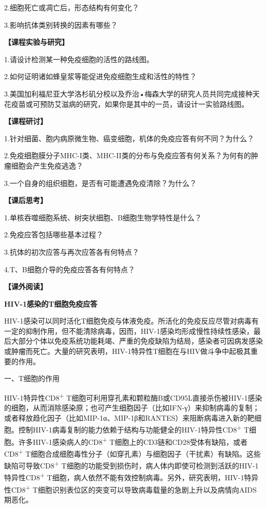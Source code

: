 2.细胞死亡或凋亡后，形态结构有何变化？

3.影响抗体类别转换的因素有哪些？

\noindent\textbf{【课程实验与研究】}

1.请设计检测某一种免疫细胞的活性的路线图。

2.如何证明诸如蜂皇浆等能促进免疫细胞生成和活性的特性？

3.美国加利福尼亚大学洛杉矶分校以及乔治•梅森大学的研究人员共同完成接种天花疫苗或可预防艾滋病的研究，如果你是其中的一员，请设计一实验路线图。

\noindent\textbf{【课程研讨】}

1.针对细菌、胞内病原微生物、癌变细胞，机体的免疫应答有何不同？为什么？

2.免疫细胞膜分子MHC-I类、MHC-II类的分布与免疫应答有何关系？为何有的肿瘤细胞会产生免疫逃逸？

3.一个自身的组织细胞，是否有可能遭遇免疫清除？为什么？

\noindent\textbf{【课后思考】}

1.单核吞噬细胞系统、树突状细胞、B细胞生物学特性是什么？

2.免疫应答包括哪些基本过程？

3.抗体的初次应答与再次应答各有何特点？

4.T、B细胞介导的免疫应答各有何特点？

\noindent\textbf{【课外阅读】}

\begin{center}
 \textbf{\Large HIV-1感染的T细胞免疫应答}
 \end{center}

HIV-1感染可以同时活化T细胞免疫与体液免疫。所活化的免疫反应尽管对病毒有一定的抑制作用，但不能清除病毒，因而，HIV-1感染均形成慢性持续性感染，最后大部分个体以免疫系统功能耗竭、严重的免疫缺陷为结局，感染者可因病发感染或肿瘤而死亡。大量的研究表明，HIV-1特异性T细胞在与HIV做斗争中起极其重要的作用。

\begin{center}
 {\large 一、T细胞的作用}
 \end{center}

HIV-1特异性CD8\textsuperscript{+}
T细胞可利用穿孔素和颗粒酶B或CD95L直接杀伤被HIV-1感染的细胞，从而消除感染原；也可产生细胞因子（比如IFN-γ）来抑制病毒的复制；或者释放趋化因子（比如MIP-1α、MIP-1β和RANTES）来阻断病毒进入新的靶细胞。控制HIV-1病毒复制的能力依赖于结构与功能健全的HIV-1特异性CD8\textsuperscript{+}
T细胞。许多HIV-1感染病人的CD8\textsuperscript{+}
T细胞上的CD3链和CD28受体有缺陷，或者CD8\textsuperscript{+}
T细胞合成细胞毒性分子（如穿孔素）与细胞因子（干扰素）有缺陷。这些缺陷可导致CD8\textsuperscript{+}
T细胞的功能受到损伤时，病人体内即使可检测到活跃的HIV-1特异性CD8\textsuperscript{+}
T细胞，病人依然不能有效控制病毒。另外，研究表明，HIV-1特异性CD8\textsuperscript{+}
T细胞识别表位区的突变可以导致病毒载量的急剧上升以及病情向AIDS期恶化。

